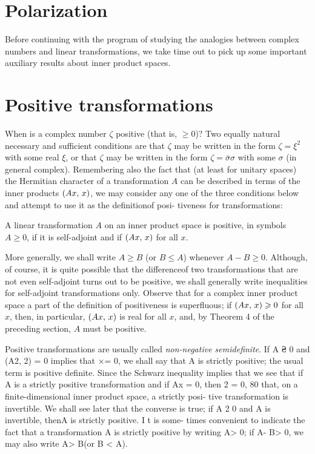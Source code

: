 \section{Polarization}

Before continuing with the program of studying the analogies between complex numbers and linear transformations, we take time out to pick up some important auxiliary results about inner product spaces.

\section{Positive transformations}

When is a complex number \(\zeta\) positive (that is, \(\geq 0\))? Two equally
natural necessary and sufficient conditions are that \(\zeta\) may be written in
the form \(\zeta = \xi^2\) with some real \(\xi\), or that \(\zeta\) may be
written in the form \(\zeta = \bar{\sigma}\sigma\) with some \(\sigma\) (in
general complex). Remembering also the fact that (at least for unitary spaces)
the Hermitian character of a transformation \(A\) can be described in terms of
the inner products \(\left(Ax,\,x\right)\), we may consider any one of the three
conditions below and attempt to use it as the definitionof posi- tiveness for
transformations:

\begin{definition}
    A linear transformation \(A\) on an inner product space is positive, in
    symbols \(A \geq 0\), if it is self-adjoint and if \(\left(Ax,\,x\right)\) for
    all \(x\).
\end{definition}

More generally, we shall write \(A \geq B\) (or \(B \leq A\)) whenever \(A - B
\geq 0\). Although, of course, it is quite possible that the differenceof two
transformations that are not even self-adjoint turns out to be positive, we
shall generally write inequalities for self-adjoint transformations only.
Observe that for a complex inner product space a part of the definition of
positiveness is superfluous; if \(\left(Ax,\,x\right) \geqslant 0\) for all \(x\),
then, in particular, \(\left(Ax,\,x\right)\) is real for all \(x\), and, by
Theorem 4 of the preceding section, \(A\) must be positive.

Positive transformations are usually called \emph{non-negative semidefinite}. If
A ₴ 0 and (A2, 2) = 0 implies that ×= 0, we shall say that A is strictly
positive; the usual term is positive definite. Since the Schwarz inequality
implies that we see that if A is a strictly positive transformation and if Ax =
0, then 2 = 0, 80 that, on a finite-dimensional inner product space, a strictly
posi- tive transformation is invertible. We shall see later that the converse is
true; if A 2 0 and A is invertible, thenA is strictly positive. I t is some-
times convenient to indicate the fact that a transformation A is strictly
positive by writing A> 0; if A- B> 0, we may also write A> B(or B < A).

